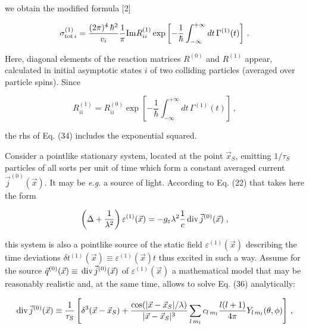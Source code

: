 \documentclass[a4paper,12pt]{article}
\begin{document}
\ni we obtain the modified formula [2]

\begin{equation}
\sigma^{(1)}_{{\rm tot}\,i} = \frac{(2\pi)^4\,\hbar^2}{v_i} \frac{1}{\pi} {\rm Im} R^{(1)}_{ii} \exp \left[-\frac{1}{\hbar} \int^{+\infty}_{-\infty} dt\, \Gamma^{(1)}(t) \right]\,.
\end{equation}

\ni Here, diagonal elements of the reaction matrices $R^{(0)}$ and $R^{(1)}$ appear, calculated in initial asymptotic states $i$ of two colliding particles (averaged over particle spins). Since

\begin{equation}
R^{(1)}_{ii} = R^{(0)}_{ii} \exp \left[-\frac{1}{\hbar} \int^{+\infty}_{-\infty} dt\, \Gamma^{(1)}(t) \right]\,,
\end{equation}

\ni the rhs of Eq. (34) includes the exponential squared.

\vspace{0.25cm}


\vspace{0.25cm}

Consider a pointlike stationary system, located at the point $\vec{x}_S$, emitting $1/\tau_S$ particles of all sorts per unit of time which form a constant averaged current $\vec{j}^{(0)}(\vec{x})$. It may be {\it e.g.} a source of light. According to Eq. (22) that takes here the form

\begin{equation}
\left(\Delta + \frac{1}{\lambda^2} \right) \varepsilon^{(1)}(\vec{x}) = -g_\varepsilon \lambda^2 \frac{1}{c} \,{\rm div}\, \vec{j}^{(0)}(\vec{x}) \;,
\end{equation}

\ni this system is also a pointlike source of the static field $\varepsilon^{(1)}(\vec{x})$ describing the time deviations $\delta t^{(1)}(\vec{x}) \equiv \varepsilon^{(1)}(\vec{x}) t$ thus excited in such a way. Assume for the source $ \vec{q}^{(0)}(\vec{x}) \equiv \,{\rm div}\, \vec{j}^{(0)}(\vec{x})$ of $ \varepsilon^{(1)}(\vec{x})$ a mathematical model that may be reasonably realistic and, at the same time, allows to solve Eq. (36) analytically:

\begin{equation}
{\rm div}\, \vec{j}^{(0)}(\vec{x}) \equiv \frac{1}{\tau_S}\left[ \delta^3(\vec{x}-\vec{x}_S) + \frac{\cos (|\vec{x}-\vec{x}_S |/\lambda)}{|\vec{x}-\vec{x}_S|^3} \sum_{l\, m_l} c_{l\, m_l} \frac{l(l+1)}{4\pi} Y_{l\,m_l}(\theta,\phi)\right]\,,
\end{equation}
\end{document}

